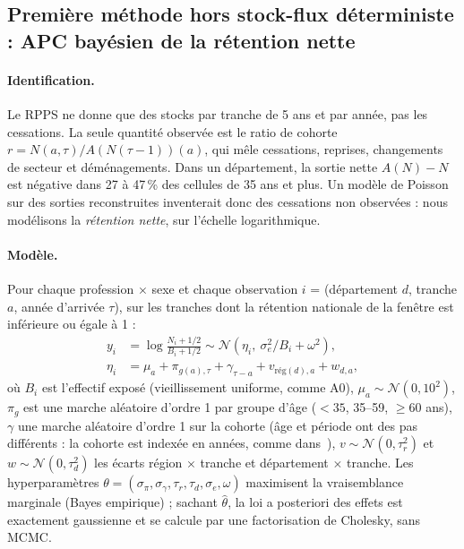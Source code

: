 \subsection{Première méthode hors stock-flux déterministe : APC bayésien de la rétention nette}
\label{a2-sec:apc}
\paragraph{Identification.} Le RPPS ne donne que des stocks par tranche de 5 ans et par année, pas les
cessations. La seule quantité observée est le ratio de cohorte
$r = N(a, \tau) / A(N(\tau-1))(a)$, qui mêle cessations, reprises, changements de secteur et
déménagements. Dans un département, la sortie nette $A(N) - N$ est négative dans 27 à 47\,\%\mesure{}
des cellules de 35 ans et plus. Un modèle de Poisson sur des sorties reconstruites inventerait donc
des cessations non observées : nous modélisons la \emph{rétention nette}, sur l'échelle logarithmique.

\paragraph{Modèle.} Pour chaque profession $\times$ sexe et chaque observation $i$ = (département $d$,
tranche $a$, année d'arrivée $\tau$), sur les tranches dont la rétention nationale de la fenêtre est
inférieure ou égale à 1 :
\begin{align}
  y_i &= \log\frac{N_i + 1/2}{B_i + 1/2} \sim \mathcal N\!\left(\eta_i,\ \sigma_e^2 / B_i + \omega^2\right),\\
  \eta_i &= \mu_a + \pi_{g(a),\tau} + \gamma_{\tau - a} + v_{\text{rég}(d),a} + w_{d,a},
\end{align}
où $B_i$ est l'effectif exposé (vieillissement uniforme, comme A0), $\mu_a \sim \mathcal N(0, 10^2)$,
$\pi_g$ est une marche aléatoire d'ordre 1 par groupe d'âge ($<35$, 35--59, $\ge 60$ ans),
$\gamma$ une marche aléatoire d'ordre 1 sur la cohorte (âge et période ont des pas différents : la
cohorte est indexée en années, comme dans~\cite{a2-schmid2007bamp}), $v \sim \mathcal N(0,\tau_r^2)$ et
$w \sim \mathcal N(0, \tau_d^2)$ les écarts région $\times$ tranche et département $\times$ tranche.
Les hyperparamètres $\theta = (\sigma_\pi, \sigma_\gamma, \tau_r, \tau_d, \sigma_e, \omega)$ maximisent
la vraisemblance marginale (Bayes empirique) ; sachant $\hat\theta$, la loi a posteriori des effets
est exactement gaussienne et se calcule par une factorisation de Cholesky, sans MCMC.


